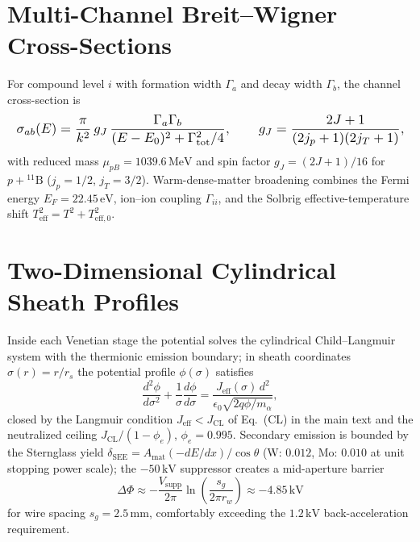 \documentclass[10pt,journal,compsoc]{IEEEtran}
\begin{document}
\section{Multi-Channel Breit--Wigner Cross-Sections}
For compound level $i$ with formation width $\Gamma_a$ and decay width
$\Gamma_b$, the channel cross-section is
\begin{equation}\resizebox{\columnwidth}{!}{$\displaystyle
\sigma_{ab}(E) = \frac{\pi}{k^2}\, g_J\,
\frac{\Gamma_a\Gamma_b}
{(E-E_0)^2 + \Gamma_{\mathrm{tot}}^2/4},
\qquad g_J = \frac{2J+1}{(2j_p+1)(2j_T+1)},
$}\end{equation}
with reduced mass $\mu_{pB} = 1039.6\,\mathrm{MeV}$ and spin factor
$g_J = (2J+1)/16$ for $p + {}^{11}\mathrm{B}$ ($j_p = 1/2$,
$j_T = 3/2$). Warm-dense-matter broadening combines the Fermi energy
$E_F = 22.45\,\mathrm{eV}$, ion--ion coupling $\Gamma_{ii}$, and the
Solbrig effective-temperature shift
$T_{\mathrm{eff}}^2 = T^2 + T_{\mathrm{eff},0}^2$.

\section{Two-Dimensional Cylindrical Sheath Profiles}
Inside each Venetian stage the potential solves the cylindrical
Child--Langmuir system with the thermionic emission boundary; in sheath
coordinates $\sigma(r) = r/r_s$ the potential profile $\phi(\sigma)$
satisfies
\begin{equation}
\frac{d^2\phi}{d\sigma^2} + \frac{1}{\sigma}\frac{d\phi}{d\sigma}
 = \frac{J_{\mathrm{eff}}(\sigma)\,d^2}
 {\epsilon_0\sqrt{2q\phi/m_\alpha}},
\end{equation}
closed by the Langmuir condition $J_{\mathrm{eff}} < J_{\mathrm{CL}}$ of
Eq.~(CL) in the main text and the neutralized ceiling
$J_{\mathrm{CL}}/(1-\phi_e)$, $\phi_e = 0.995$. Secondary emission is
bounded by the Sternglass yield $\delta_{\mathrm{SEE}} = A_{\mathrm{mat}}
(-dE/dx)/\cos\theta$ (W: $0.012$, Mo: $0.010$ at unit stopping power
scale); the $-50\,\mathrm{kV}$ suppressor creates a mid-aperture barrier
\begin{equation}
\Delta\Phi \approx -\frac{V_{\mathrm{supp}}}{2\pi}
\ln\!\left(\frac{s_g}{2\pi r_w}\right)
\approx -4.85\,\mathrm{kV}
\end{equation}
for wire spacing $s_g = 2.5\,\mathrm{mm}$, comfortably exceeding the
$1.2\,\mathrm{kV}$ back-acceleration requirement.
\end{document}
